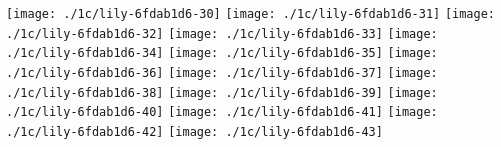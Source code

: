 \else
  \expandafter{}%
\fi
\texttt{[image: ./1c/lily-6fdab1d6-30]}%
\ifx\betweenLilyPondSystem \undefined
  \linebreak
\else
  \expandafter{}%
\fi
\texttt{[image: ./1c/lily-6fdab1d6-31]}%
\ifx\betweenLilyPondSystem \undefined
  \linebreak
\else
  \expandafter{}%
\fi
\texttt{[image: ./1c/lily-6fdab1d6-32]}%
\ifx\betweenLilyPondSystem \undefined
  \linebreak
\else
  \expandafter{}%
\fi
\texttt{[image: ./1c/lily-6fdab1d6-33]}%
\ifx\betweenLilyPondSystem \undefined
  \linebreak
\else
  \expandafter{}%
\fi
\texttt{[image: ./1c/lily-6fdab1d6-34]}%
\ifx\betweenLilyPondSystem \undefined
  \linebreak
\else
  \expandafter{}%
\fi
\texttt{[image: ./1c/lily-6fdab1d6-35]}%
\ifx\betweenLilyPondSystem \undefined
  \linebreak
\else
  \expandafter{}%
\fi
\texttt{[image: ./1c/lily-6fdab1d6-36]}%
\ifx\betweenLilyPondSystem \undefined
  \linebreak
\else
  \expandafter{}%
\fi
\texttt{[image: ./1c/lily-6fdab1d6-37]}%
\ifx\betweenLilyPondSystem \undefined
  \linebreak
\else
  \expandafter{}%
\fi
\texttt{[image: ./1c/lily-6fdab1d6-38]}%
\ifx\betweenLilyPondSystem \undefined
  \linebreak
\else
  \expandafter{}%
\fi
\texttt{[image: ./1c/lily-6fdab1d6-39]}%
\ifx\betweenLilyPondSystem \undefined
  \linebreak
\else
  \expandafter{}%
\fi
\texttt{[image: ./1c/lily-6fdab1d6-40]}%
\ifx\betweenLilyPondSystem \undefined
  \linebreak
\else
  \expandafter{}%
\fi
\texttt{[image: ./1c/lily-6fdab1d6-41]}%
\ifx\betweenLilyPondSystem \undefined
  \linebreak
\else
  \expandafter{}%
\fi
\texttt{[image: ./1c/lily-6fdab1d6-42]}%
\ifx\betweenLilyPondSystem \undefined
  \linebreak
\else
  \expandafter{}%
\fi
\texttt{[image: ./1c/lily-6fdab1d6-43]}%
\ifx\betweenLilyPondSystem \undefined
  \linebreak
\else
  \expandafter{}%
